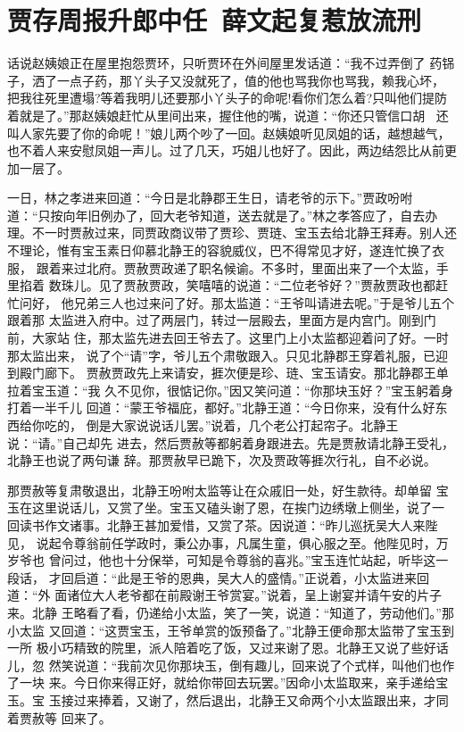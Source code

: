 \chapter{贾存周报升郎中任~薛文起复惹放流刑}

话说赵姨娘正在屋里抱怨贾环，只听贾环在外间屋里发话道：“我不过弄倒了
药铞子，洒了一点子药，那丫头子又没就死了，值的他也骂我你也骂我，赖我心坏，
把我往死里遭塌?等着我明儿还要那小丫头子的命呢!看你们怎么着?只叫他们提防
着就是了。”那赵姨娘赶忙从里间出来，握住他的嘴，说道：“你还只管信口胡，
还叫人家先要了你的命呢！”娘儿两个吵了一回。赵姨娘听见凤姐的话，越想越气，
也不着人来安慰凤姐一声儿。过了几天，巧姐儿也好了。因此，两边结怨比从前更
加一层了。

一日，林之孝进来回道：“今日是北静郡王生日，请老爷的示下。”贾政吩咐
道：“只按向年旧例办了，回大老爷知道，送去就是了。”林之孝答应了，自去办
理。不一时贾赦过来，同贾政商议带了贾珍、贾琏、宝玉去给北静王拜寿。别人还
不理论，惟有宝玉素日仰慕北静王的容貌威仪，巴不得常见才好，遂连忙换了衣服，
跟着来过北府。贾赦贾政递了职名候谕。不多时，里面出来了一个太监，手里掐着
数珠儿。见了贾赦贾政，笑嘻嘻的说道：“二位老爷好？”贾赦贾政也都赶忙问好，
他兄弟三人也过来问了好。那太监道：“王爷叫请进去呢。”于是爷儿五个跟着那
太监进入府中。过了两层门，转过一层殿去，里面方是内宫门。刚到门前，大家站
住，那太监先进去回王爷去了。这里门上小太监都迎着问了好。一时那太监出来，
说了个“请”字，爷儿五个肃敬跟入。只见北静郡王穿着礼服，已迎到殿门廊下。
贾赦贾政先上来请安，捱次便是珍、琏、宝玉请安。那北静郡王单拉着宝玉道：“我
久不见你，很惦记你。”因又笑问道：“你那块玉好？”宝玉躬着身打着一半千儿
回道：“蒙王爷福庇，都好。”北静王道：“今日你来，没有什么好东西给你吃的，
倒是大家说说话儿罢。”说着，几个老公打起帘子。北静王说：“请。”自己却先
进去，然后贾赦等都躬着身跟进去。先是贾赦请北静王受礼，北静王也说了两句谦
辞。那贾赦早已跪下，次及贾政等捱次行礼，自不必说。

那贾赦等复肃敬退出，北静王吩咐太监等让在众戚旧一处，好生款待。却单留
宝玉在这里说话儿，又赏了坐。宝玉又磕头谢了恩，在挨门边绣墩上侧坐，说了一
回读书作文诸事。北静王甚加爱惜，又赏了茶。因说道：“昨儿巡抚吴大人来陛见，
说起令尊翁前任学政时，秉公办事，凡属生童，俱心服之至。他陛见时，万岁爷也
曾问过，他也十分保举，可知是令尊翁的喜兆。”宝玉连忙站起，听毕这一段话，
才回启道：“此是王爷的恩典，吴大人的盛情。”正说着，小太监进来回道：“外
面诸位大人老爷都在前殿谢王爷赏宴。”说着，呈上谢宴并请午安的片子来。北静
王略看了看，仍递给小太监，笑了一笑，说道：“知道了，劳动他们。”那小太监
又回道：“这贾宝玉，王爷单赏的饭预备了。”北静王便命那太监带了宝玉到一所
极小巧精致的院里，派人陪着吃了饭，又过来谢了恩。北静王又说了些好话儿，忽
然笑说道：“我前次见你那块玉，倒有趣儿，回来说了个式样，叫他们也作了一块
来。今日你来得正好，就给你带回去玩罢。”因命小太监取来，亲手递给宝玉。宝
玉接过来捧着，又谢了，然后退出，北静王又命两个小太监跟出来，才同着贾赦等
回来了。

